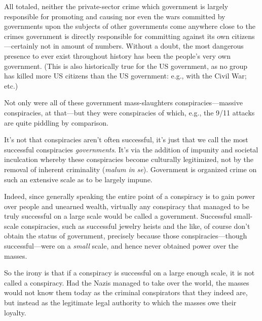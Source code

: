 \documentclass[letterpaper,12pt]{article}
\begin{document}
All totaled, neither the private-sector crime which government is largely responsible for promoting and causing nor even the wars committed by governments upon the subjects of other governments come anywhere close to the crimes government is directly responsible for committing against its own citizens---certainly not in amount of numbers. Without a doubt, the most dangerous presence to ever exist throughout history has been the people's very own government. (This is also historically true for the US government, as no group has killed more US citizens than the US government: e.g., with the Civil War; etc.)

Not only were all of these government mass-slaughters conspiracies---massive conspiracies, at that---but they were conspiracies of which, e.g., the 9/11 attacks are quite piddling by comparison.

It's not that conspiracies aren't often successful, it's just that we call the most successful conspiracies \emph{governments}. It's via the addition of impunity and societal inculcation whereby these conspiracies become culturally legitimized, not by the removal of inherent criminality (\emph{malum in se}). Government is organized crime on such an extensive scale as to be largely impune.

Indeed, since generally speaking the entire point of a conspiracy is to gain power over people and unearned wealth, virtually any conspiracy that managed to be truly successful on a large scale would be called a government. Successful small-scale conspiracies, such as successful jewelry heists and the like, of course don't obtain the status of government, precisely because those conspiracies---though successful---were on a \emph{small} scale, and hence never obtained power over the masses.

So the irony is that if a conspiracy is successful on a large enough scale, it is not called a conspiracy. Had the Nazis managed to take over the world, the masses would not know them today as the criminal conspirators that they indeed are, but instead as the legitimate legal authority to which the masses owe their loyalty.
\end{document}
